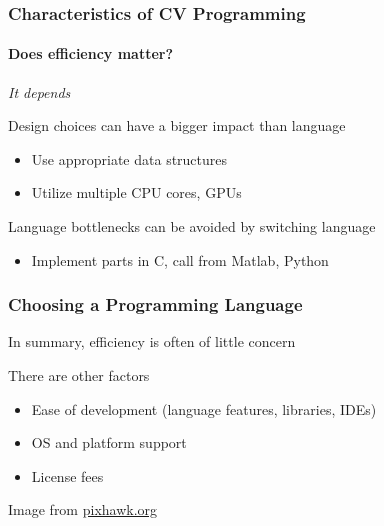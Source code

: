 \documentclass[xetex,professionalfont]{beamer}
\begin{document}
\begin{frame}
\frametitle{Characteristics of CV Programming}
\framesubtitle{Does efficiency matter?}

\emph{It depends}

\bigskip
Design choices can have a bigger impact than language
\begin{itemize}
	\item Use appropriate data structures
	\item Utilize multiple CPU cores, GPUs
\end{itemize}

\bigskip
Language bottlenecks can be avoided by switching language
\begin{itemize}
	\item Implement parts in C, call from Matlab, Python
\end{itemize}

\end{frame}


\begin{frame}
\frametitle{Choosing a Programming Language}

In summary, efficiency is often of little concern

\bigskip
There are other factors
\begin{itemize}
	\item Ease of development (language features, libraries, IDEs)
	\item OS and platform support %
	\item License fees %
\end{itemize}

\begin{center}
	{\centering Image from \url{pixhawk.org}}
\end{center}

\end{frame}

\end{document}
